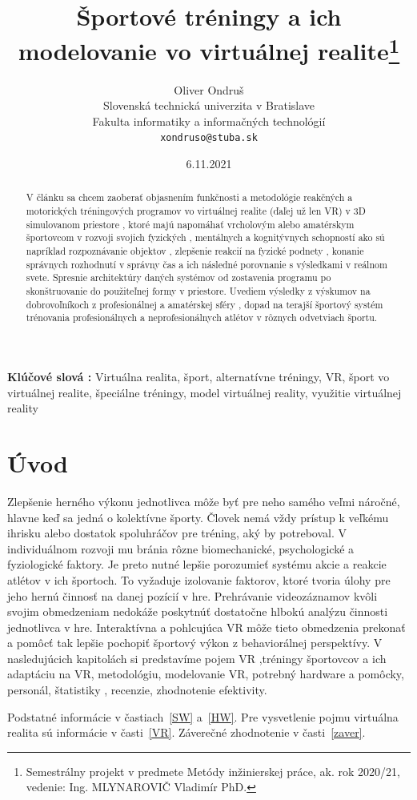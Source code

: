 \documentclass[10pt,twoside,slovak,a4paper]{article}										%
\title{Športové tréningy a ich modelovanie vo virtuálnej realite\thanks{Semestrálny projekt v predmete Metódy inžinierskej práce, ak. rok 2020/21, vedenie: Ing. MLYNAROVIČ Vladimír  PhD.}}
\author{Oliver Ondruš\\[2pt]
	{\small Slovenská technická univerzita v Bratislave}\\
	{\small Fakulta informatiky a informačných technológií}\\
	{\small \texttt{xondruso@stuba.sk}}
	}
\date{\small 6.11.2021}
\begin{document}
\maketitle

\begin{abstract}
V článku sa chcem zaoberať objasnením funkčnosti a metodológie reakčných a motorických tréningových programov vo virtuálnej realite (ďaľej už len VR) v 3D simulovanom priestore , ktoré majú napomáhať vrcholovým alebo amatérskym športovcom v rozvoji svojich fyzických , mentálnych a kognitývnych schopností ako sú napríklad rozpoznávanie objektov , zlepšenie reakcií na fyzické podnety , konanie správnych rozhodnutí v správny čas a ich následné porovnanie s výsledkami v reálnom svete. Spresnie architektúry daných systémov od zostavenia programu po skonštruovanie do použiteľnej formy v priestore. Uvediem výsledky z výskumov na dobrovoľníkoch z profesionálnej a amatérskej sféry , dopad na terajší športový systém trénovania profesionálnych a neprofesionálnych atlétov v rôznych odvetviach športu.
\end{abstract}

\textbf{Klúčové slová :}
Virtuálna realita, šport, alternatívne tréningy, VR, šport vo virtuálnej realite, špeciálne tréningy, model virtuálnej reality, využitie virtuálnej reality

\section{Úvod}
Zlepšenie herného výkonu jednotlivca môže byť pre neho samého veľmi náročné, hlavne keď sa jedná o kolektívne športy. Človek nemá vždy prístup k veľkému ihrisku alebo dostatok spoluhráčov pre tréning, aký by potreboval. V individuálnom rozvoji mu bránia rôzne biomechanické, psychologické a fyziologické faktory. Je preto nutné lepšie porozumieť systému akcie a reakcie atlétov v ich športoch. To vyžaduje izolovanie faktorov, ktoré tvoria úlohy pre jeho hernú činnosť na danej pozícií v hre. Prehrávanie videozáznamov kvôli svojim obmedzeniam nedokáže poskytnúť dostatočne hlbokú analýzu činnosti jednotlivca v hre. Interaktívna a pohlcujúca VR môže tieto obmedzenia prekonať a pomôcť tak lepšie pochopiť športový výkon z behaviorálnej perspektívy. V nasledujúcich kapitolách si predstavíme pojem VR ,tréningy športovcov a ich adaptáciu na VR, metodológiu, modelovanie VR, potrebný hardware a pomôcky, personál, štatistiky , recenzie, zhodnotenie efektivity. ~\cite{Hlavny:zdroj}

Podstatné informácie v častiach~\ref{SW} a~\ref{HW}. Pre vysvetlenie pojmu virtuálna realita sú informácie v časti~\ref{VR}. 
Záverečné zhodnotenie v časti~\ref{zaver}.
\end{document}
